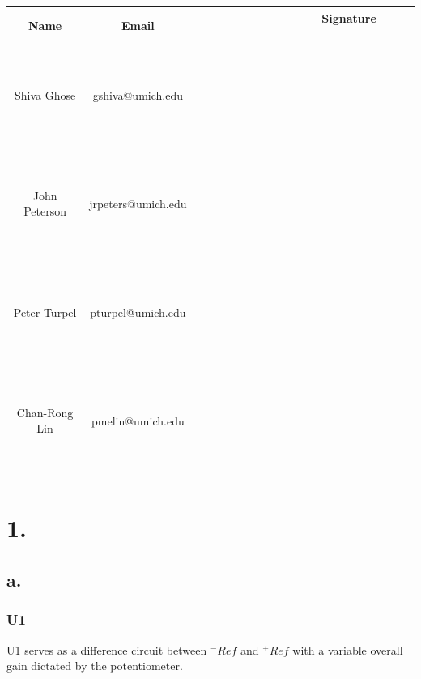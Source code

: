 \documentclass{article}
\theoremstyle{plain}
\theoremstyle{definition}
\theoremstyle{remark}
\begin{document}
\begin{table}[h]
\begin{center}
    \begin{tabular}{|c|c|c|}
        \hline
        \textbf{Name} & \textbf{Email}     & \textbf{ \ \ \ \ \  \ \  \ \ \ \ \  \ \ Signature  \ \ \ \ \  \ \ \ \ \ \ \  \ \ } \\ \hline
        	~& ~& ~\\
	~& ~& ~\\
	Shiva Ghose   & gshiva@umich.edu   & ~                  \\
	~& ~& ~\\
	~& ~& ~\\ \hline 
	~& ~& ~\\
	~& ~& ~\\
        John Peterson & jrpeters@umich.edu & ~                  \\ 
	~& ~& ~\\
	~& ~& ~\\ \hline 
	~& ~& ~\\
	~& ~& ~\\
        Peter Turpel   & pturpel@umich.edu & ~                  \\
	~& ~& ~\\
	~& ~& ~\\ \hline 
	~& ~& ~\\
	~& ~& ~\\
        Chan-Rong Lin   & pmelin@umich.edu & ~                  \\
	~& ~& ~\\
	~& ~& ~\\ \hline 
        \hline
    \end{tabular}
\end{center}
\end{table}

\newpage

\section*{1.}

\subsection*{a.}

\subsubsection*{U1}
U1 serves as a difference circuit between $^-Ref$ and $^+Ref$ with a variable overall gain dictated by the potentiometer.
\end{document}

